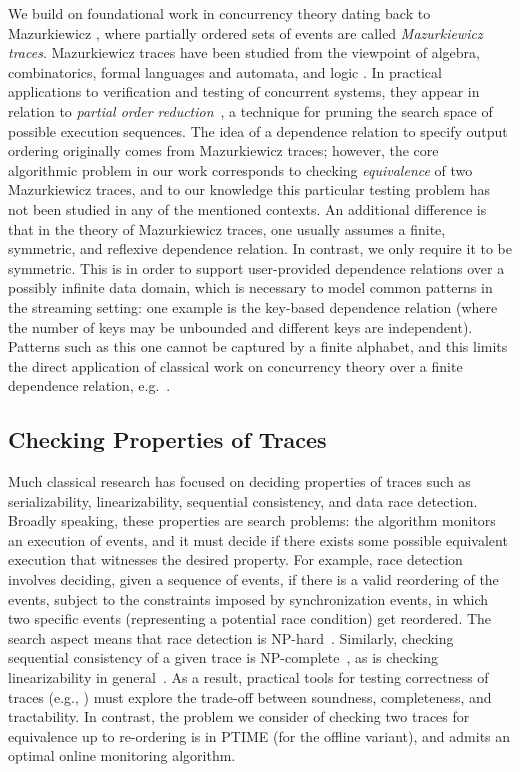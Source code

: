 We build on foundational work in concurrency theory dating back to Mazurkiewicz \cite{mazurkiewicz1986trace}, where partially ordered sets of events are called \emph{Mazurkiewicz traces}. Mazurkiewicz traces have been studied from the
viewpoint of algebra, combinatorics, formal languages and automata, and
logic \cite{DiekertR1995}. In practical applications to verification and
testing of concurrent systems, they appear in relation to
\emph{partial order reduction}~\cite{God96,Peled94}, a technique for
pruning the search space of possible execution sequences.
The idea of a dependence relation to specify output ordering originally comes from Mazurkiewicz traces; however, the core algorithmic problem in our work corresponds to checking \emph{equivalence} of two Mazurkiewicz traces, and to our knowledge this particular testing problem has not been studied in any of the mentioned contexts.
An additional difference is that in the theory of Mazurkiewicz traces, one usually assumes a finite, symmetric, and reflexive dependence relation. In contrast, we only require it to be symmetric. This is in order to support user-provided dependence relations over a possibly infinite data domain, which is necessary to model common patterns in the streaming setting: one example is the key-based dependence relation (where the number of keys may be unbounded and different keys are independent). Patterns such as this one cannot be captured by a finite alphabet, and this limits the direct application of classical work on concurrency theory over a finite dependence relation, e.g.~\cite{DiekertR1995}.

\subsection{Checking Properties of Traces}

Much classical research has focused on deciding properties of traces such as serializability, linearizability, sequential consistency, and data race detection.
Broadly speaking, these properties are search problems: the algorithm monitors an execution of events, and it must decide if there exists some possible equivalent execution that witnesses the desired property. For example, race detection involves deciding, given a sequence of events, if there is a valid reordering of the events, subject to the constraints imposed by synchronization events, in which two specific events (representing a potential race condition) get reordered. The search aspect means that race detection is NP-hard~\cite{netzer1990complexity,netzer1992race}.
Similarly, checking sequential consistency of a given trace is NP-complete~\cite{gibbons1992complexity},
as is checking linearizability in general~\cite{gibbons1997testing}.
As a result, practical tools for testing correctness of traces (e.g., \cite{savage1997eraser,park2011efficient,sen2008race,wing1993testing,burckhardt2010line,lowe2017testing}) must explore the trade-off between soundness, completeness, and tractability.
In contrast, the problem we consider of checking two traces for equivalence up to re-ordering is in PTIME (for the offline variant), and admits an optimal online monitoring algorithm.

